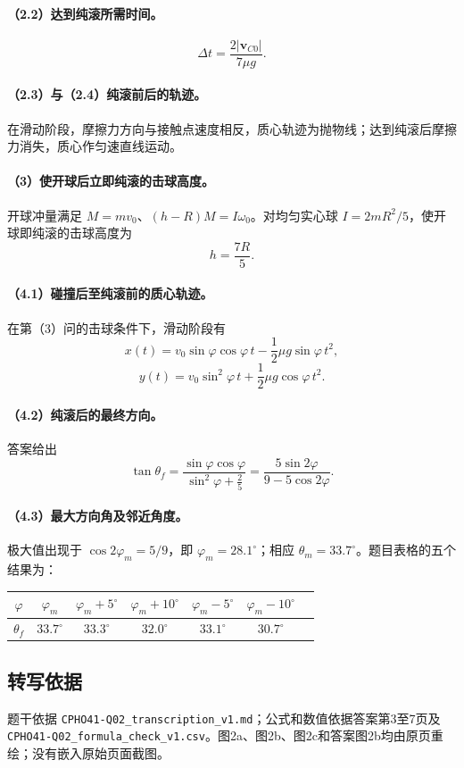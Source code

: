\paragraph{（2.2）达到纯滚所需时间。}
\[\Delta t=\frac{2|\boldsymbol v_{C0}|}{7\mu g}.\]
\paragraph{（2.3）与（2.4）纯滚前后的轨迹。}
在滑动阶段，摩擦力方向与接触点速度相反，质心轨迹为抛物线；达到纯滚后摩擦力消失，质心作匀速直线运动。

\paragraph{（3）使开球后立即纯滚的击球高度。}
开球冲量满足 $M=mv_0$、$(h-R)M=I\omega_0$。对均匀实心球 $I=2mR^2/5$，使开球即纯滚的击球高度为
\[\boxed{h=\frac{7R}{5}}.\]
\paragraph{（4.1）碰撞后至纯滚前的质心轨迹。}
在第（3）问的击球条件下，滑动阶段有
\[
x(t)=v_0\sin\varphi\cos\varphi\,t-\frac12\mu g\sin\varphi\,t^2,
\]
\[
y(t)=v_0\sin^2\varphi\,t+\frac12\mu g\cos\varphi\,t^2.
\]
\paragraph{（4.2）纯滚后的最终方向。}
答案给出
\[\tan\theta_f=\frac{\sin\varphi\cos\varphi}{\sin^2\varphi+\frac25}=\frac{5\sin2\varphi}{9-5\cos2\varphi}.\]
\paragraph{（4.3）最大方向角及邻近角度。}
极大值出现于 $\cos2\varphi_m=5/9$，即 $\varphi_m=28.1^\circ$；相应 $\theta_m=33.7^\circ$。题目表格的五个结果为：
\begin{center}
\begin{tabular}{c|cccccc}\hline
$\varphi$ & $\varphi_m$ & $\varphi_m+5^\circ$ & $\varphi_m+10^\circ$ & $\varphi_m-5^\circ$ & $\varphi_m-10^\circ$\\\hline
$\theta_f$ & $33.7^\circ$ & $33.3^\circ$ & $32.0^\circ$ & $33.1^\circ$ & $30.7^\circ$\\\hline
\end{tabular}
\end{center}
\subsection{转写依据}
题干依据 \texttt{CPHO41-Q02\_transcription\_v1.md}；公式和数值依据答案第3至7页及 \texttt{CPHO41-Q02\_formula\_check\_v1.csv}。图2a、图2b、图2c和答案图2b均由原页重绘；没有嵌入原始页面截图。
